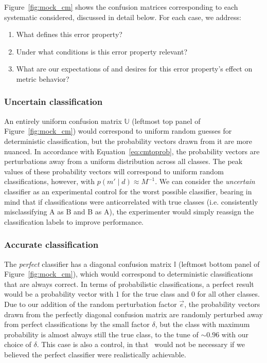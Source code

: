 Figure~\ref{fig:mock_cm} shows the confusion matrices corresponding to each systematic considered, discussed in detail below.
For each case, we address:
\begin{enumerate}
  \item What defines this error property?
  \item Under what conditions is this error property relevant?
  \item What are our expectations of and desires for this error property's effect on metric behavior?
\end{enumerate}

\subsubsection{Uncertain classification}
\label{sec:uncertaindata}

An entirely uniform confusion matrix $\mathbb{U}$ (leftmost top panel of Figure~\ref{fig:mock_cm}) would correspond to uniform random guesses for deterministic classification, but the probability vectors drawn from it are more nuanced.
In accordance with Equation~\ref{eq:cmtoprob}, the probability vectors are perturbations away from a uniform distribution across all classes.
The peak values of these probability vectors will correspond to uniform random classifications, however, with $p(m' \mid d)\approx M^{-1}$.
We can consider the \textit{uncertain} classifier as an experimental control for the worst possible classifier, bearing in mind that if classifications were anticorrelated with true classes (i.e. consistently misclassifying A as B and B as A), the experimenter would simply reassign the classification labels to improve performance.

\subsubsection{Accurate classification}
\label{sec:accuratedata}

The \textit{perfect} classifier has a diagonal confusion matrix $\mathbb{I}$ (leftmost bottom panel of Figure~\ref{fig:mock_cm}), which would correspond to deterministic classifications that are always correct.
In terms of probabilistic classifications, a perfect result would be a probability vector with 1 for the true class and 0 for all other classes.
Due to our addition of the random perturbation factor $\vec{e}$, the probability vectors drawn from the perfectly diagonal confusion matrix are randomly perturbed away from perfect classifications by the small factor $\delta$, but the class with maximum probability is almost always still the true class, to the tune of $\sim0.96$ with our choice of $\delta$.
This case is also a control, in that \plasticc\ would not be necessary if we believed the perfect classifier were realistically achievable.

